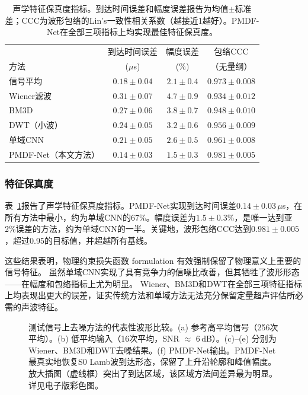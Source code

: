 \begin{table}[htbp]
\centering
\caption{声学特征保真度指标。到达时间误差和幅度误差报告为均值$\pm$标准差；CCC为波形包络的Lin's一致性相关系数（越接近1越好）。PMDF-Net在全部三项指标上均实现最佳特征保真度。}
\label{tab:feature-preservation}
\begin{tabular}{lccc}
\toprule
 & 到达时间误差 & 幅度误差 & 包络CCC \\
方法 & ($\mu$s) & ($\%$) & （无量纲） \\
\midrule
信号平均 & $0.18 \pm 0.04$ & $2.1 \pm 0.4$ & $0.973 \pm 0.008$ \\
Wiener滤波 & $0.31 \pm 0.07$ & $4.7 \pm 0.9$ & $0.934 \pm 0.012$ \\
BM3D & $0.27 \pm 0.06$ & $3.8 \pm 0.7$ & $0.948 \pm 0.010$ \\
DWT（小波） & $0.24 \pm 0.05$ & $3.2 \pm 0.6$ & $0.956 \pm 0.009$ \\
单域CNN & $0.21 \pm 0.05$ & $2.6 \pm 0.5$ & $0.961 \pm 0.008$ \\
PMDF-Net（本文方法） & $\mathbf{0.14 \pm 0.03}$ & $\mathbf{1.5 \pm 0.3}$ & $\mathbf{0.981 \pm 0.005}$ \\
\bottomrule
\end{tabular}
\end{table}

\subsubsection{特征保真度}

表~\ref{tab:feature-preservation}报告了声学特征保真度指标。PMDF-Net实现到达时间误差$0.14 \pm 0.03$\,$\mu$s，在所有方法中最小，约为单域CNN的67\%。幅度误差为$1.5 \pm 0.3\%$，是唯一达到亚2\%误差的方法，约为单域CNN的一半。关键地，波形包络CCC达到$0.981 \pm 0.005$，超过0.95的目标值，并超越所有基线。

这些结果表明，物理约束损失函数 formulation 有效强制保留了物理意义上重要的信号特征。
虽然单域CNN实现了具有竞争力的信噪比改善，但其牺牲了波形形态——在幅度和包络指标上尤为明显。
Wiener、BM3D和DWT在全部三项特征指标上均表现出更大的误差，证实传统方法和单域方法无法充分保留定量超声评估所必需的声波特征。

\begin{figure}[htbp]
\centering
\caption{测试信号上去噪方法的代表性波形比较。(a) 参考高平均信号（256次平均）。(b) 低平均输入（16次平均，SNR $\approx$ 6\,dB）。(c)--(e) 分别为Wiener、BM3D和DWT去噪结果。(f) PMDF-Net输出。PMDF-Net最真实地恢复S0 Lamb波到达形态，保留了上升沿轮廓和峰值幅度。放大插图（虚线框）突出了到达区域，该区域方法间差异最为明显。详见电子版彩色图。}
\label{fig:denoising-examples}
\end{figure}

